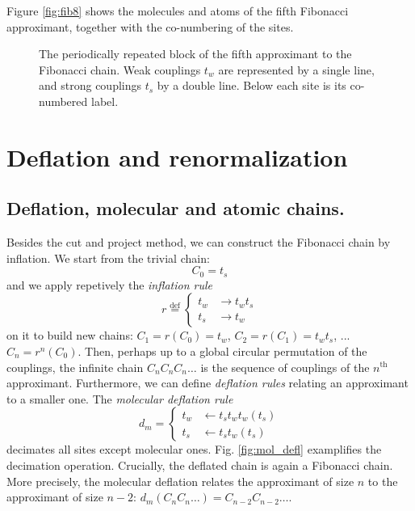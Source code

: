 \documentclass[aps,prl,preprint]{revtex4-1}
\newcommand{\define}{\ensuremath{ \overset{\text{def}}{=} }}
\begin{document}
Figure \eqref{fig:fib8} shows the molecules and atoms of the fifth Fibonacci approximant, together with the co-numbering of the sites.

\begin{figure}[htp]
	
	\caption{The periodically repeated block of the fifth approximant to the Fibonacci chain. Weak couplings $t_w$ are represented by a single line, and strong couplings $t_s$ by a double line. Below each site is its co-numbered label.}
\label{fig:fib8}
\end{figure}

\section{Deflation and renormalization}

\subsection{Deflation, molecular and atomic chains.}
Besides the cut and project method, we can construct the Fibonacci chain by inflation.
We start from the trivial chain:
\begin{equation}
	C_0 = t_s
\end{equation}
and we apply repetively the \emph{inflation rule}
\begin{equation}
	r \define \begin{cases}
        t_{w} & \rightarrow t_w t_s \\
        t_s & \rightarrow t_w
      \end{cases}
\end{equation} 
on it to build new chains: $C_1 = r(C_0) = t_w$, $C_2 = r(C_1) = t_w t_s$, ... $C_n = r^n(C_0)$.
Then, perhaps up to a global circular permutation of the couplings, the infinite chain $C_n C_n C_n \dots$ is the sequence of couplings of the $n^\text{th}$ approximant.
Furthermore, we can define \emph{deflation rules} relating an approximant to a smaller one.
The \emph{molecular deflation rule}
\begin{equation}
	d_m = \begin{cases}
        t_{w} & \leftarrow t_s t_w t_w (t_s)\\
        t_s & \leftarrow t_s t_w (t_s)
      \end{cases}
\end{equation}
decimates all sites except molecular ones. Fig. \eqref{fig:mol_defl} examplifies the decimation operation.
Crucially, the deflated chain is again a Fibonacci chain. More precisely, the molecular deflation relates the approximant of size $n$ to the approximant of size $n-2$: $d_m(C_n C_n \dots) = C_{n-2} C_{n-2} \dots$.
\end{document}
